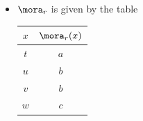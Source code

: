\begin{gradedexercise}
\begin{enumerate}
\begin{itemize}
\begin{center}
\begin{tabular}{c|c}
                                $5$ & $a$ \\
                                $6$ & $c$
                            \end{tabular}
                        \end{center}
                  \item $\mora_r$ is given by the table
                        \begin{center}
                            \begin{tabular}{c|c}
                                $x$ & $\mora_r(x)$ \\
                                \hline
                                $t$ & $a$ \\
                                $u$ & $b$ \\
                                $v$ & $b$ \\
                                $w$ & $c$
                            \end{tabular}
                        \end{center}
              \end{itemize}
    \end{enumerate}

\end{gradedexercise}



